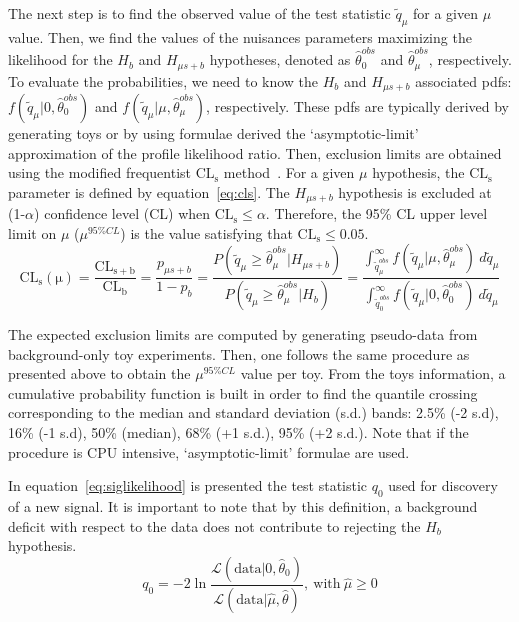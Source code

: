 The next step is to find the observed value of the test statistic $\tilde{q}_{\mu}$ for a given $\mu$ value. Then, we find the values of the nuisances parameters maximizing the likelihood for the $H_{b}$ and $H_{\mu s+b}$ hypotheses, denoted as $\hat{\theta}_{0}^{obs}$  and $\hat{\theta}_{\mu}^{obs}$, respectively. To evaluate the probabilities, we need to know the $H_{b}$ and $H_{\mu s+b}$ associated pdfs: $f(\tilde{q}_{\mu}|0,\hat{\theta}_{0}^{obs})$ and $f(\tilde{q}_{\mu}|\mu,\hat{\theta}_{\mu}^{obs})$, respectively. These pdfs are typically derived by generating toys or by using formulae derived the `asymptotic-limit' approximation of the profile likelihood ratio. Then, exclusion limits are obtained using the modified frequentist $\mathrm{CL_{s}}$ method~\cite{Read:2002hq}. For a given $\mu$ hypothesis, the $\mathrm{CL_{s}}$ parameter is defined by equation~\ref{eq:cls}. The $H_{\mu s+b}$ hypothesis is excluded at (1-$\alpha$) confidence level (CL) when $\mathrm{CL_{s}}\leq\alpha$. Therefore, the 95\% CL upper level limit on $\mu$ ($\mu^{95\%CL}$) is the value satisfying that $\mathrm{CL_{s}}\leq0.05$.
\begin{equation} \label{eq:cls}
    \mathrm{CL_{s}(\mu) = \frac{CL_{s+b}}{CL_{b}}} = \frac{p_{\mu s+b}}{1-p_{b}} 
    = \frac{P(\tilde{q}_{\mu} \geq \hat{\theta}_{\mu}^{obs} | H_{\mu s+b} ) }{P(\tilde{q}_{\mu} \geq \hat{\theta}_{\mu}^{obs} | H_{b}  )}
    = \frac{ \int^{\infty}_{\tilde{q}_{\mu}^{obs}}  f(\tilde{q}_{\mu}|\mu,\hat{\theta}_{\mu}^{obs})~d\tilde{q}_{\mu}   }{  \int^{\infty}_{\tilde{q}_{0}^{obs}}  f(\tilde{q}_{\mu}|0,\hat{\theta}_{0}^{obs})~d\tilde{q}_{\mu} }
\end{equation}

The expected exclusion limits are computed by generating pseudo-data from background-only toy experiments. Then, one follows the same procedure as presented above to obtain the $\mu^{95\%CL}$ value per toy. From the toys information, a cumulative probability function is built in order to find the quantile crossing corresponding to the median and standard deviation (s.d.) bands: 2.5\% (-2 s.d), 16\% (-1 s.d), 50\% (median), 68\% (+1 s.d.), 95\% (+2 s.d.). Note that if the procedure is CPU intensive, `asymptotic-limit' formulae are used.

In equation~\ref{eq:siglikelihood} is presented the test statistic $q_{0}$ used for discovery of a new signal. It is important to note that by this definition, a background deficit with respect to the data does not contribute to rejecting the $H_{b}$ hypothesis.
\begin{equation}\label{eq:siglikelihood}
   q_{0}= -2 \ln \frac{ \mathcal{L}(\mathrm{data}|0, \hat{\theta}_{0}) }{ \mathcal{L}(\mathrm{data}| \hat{\mu}, \hat{\theta})} \mathrm{,~ with}~ \hat{\mu} \geq 0  
\end{equation}

